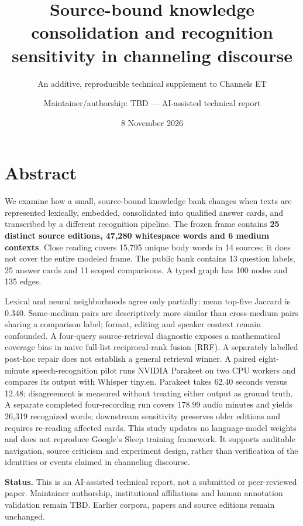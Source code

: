 \documentclass[
  10pt,
]{article}
\title{Source-bound knowledge consolidation and recognition sensitivity
in channeling discourse}
\subtitle{An additive, reproducible technical supplement to Channels ET}
\author{Maintainer/authorship: TBD --- AI-assisted technical report}
\date{8 November 2026}
\begin{document}
\maketitle

\section{Abstract}\label{abstract}

We examine how a small, source-bound knowledge bank changes when texts
are represented lexically, embedded, consolidated into qualified answer
cards, and transcribed by a different recognition pipeline. The frozen
frame contains \textbf{25 distinct source editions, 47,280 whitespace
words and 6 medium contexts}. Close reading covers 15,795 unique body
words in 14 sources; it does not cover the entire modeled frame. The
public bank contains 13 question labels, 25 answer cards and 11 scoped
comparisons. A typed graph has 100 nodes and 135 edges.

Lexical and neural neighborhoods agree only partially: mean top-five
Jaccard is 0.340. Same-medium pairs are descriptively more similar than
cross-medium pairs sharing a comparison label; format, editing and
speaker context remain confounded. A four-query source-retrieval
diagnostic exposes a mathematical coverage bias in naive full-list
reciprocal-rank fusion (RRF). A separately labelled post-hoc repair does
not establish a general retrieval winner. A paired eight-minute
speech-recognition pilot runs NVIDIA Parakeet on two CPU workers and
compares its output with Whisper tiny.en. Parakeet takes 62.40 seconds
versus 12.48; disagreement is measured without treating either output as
ground truth. A separate completed four-recording run covers 178.99
audio minutes and yields 26,319 recognized words; downstream sensitivity
preserves older editions and requires re-reading affected cards. This
study updates no language-model weights and does not reproduce Google's
Sleep training framework. It supports auditable navigation, source
criticism and experiment design, rather than verification of the
identities or events claimed in channeling discourse.

\textbf{Status.} This is an AI-assisted technical report, not a
submitted or peer-reviewed paper. Maintainer authorship, institutional
affiliations and human annotation validation remain TBD. Earlier
corpora, papers and source editions remain unchanged.

\clearpage
\tableofcontents
\clearpage
\end{document}
